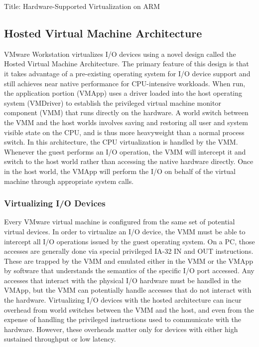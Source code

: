 \documentclass[runningheads]{llncs}
\begin{document}
Title: Hardware-Supported Virtualization on ARM


\subsection{Hosted Virtual Machine Architecture}
VMware Workstation virtualizes I/O devices using a novel design called the Hosted Virtual Machine Architecture. The primary feature of this design is that it takes advantage of a pre-existing operating system for I/O device support and still achieves near native performance for CPU-intensive workloads. When run, the application portion (VMApp) uses a driver loaded into the host operating system (VMDriver) to establish the privileged virtual machine monitor component (VMM) that runs directly on the hardware.  A world switch between the VMM and the host worlds involves saving and restoring all user and system visible state on the CPU, and is thus more heavyweight than a normal process switch. In this architecture, the CPU virtualization is handled by the VMM. Whenever the guest performs an I/O operation, the VMM will intercept it and switch to the host world rather than accessing the native hardware directly. Once in the host world, the VMApp will perform the I/O on behalf of the virtual machine through appropriate system calls.
 
\subsubsection{Virtualizing I/O Devices}
Every VMware virtual machine is configured from the same set of potential virtual devices. In order to virtualize an I/O device, the VMM must be able to intercept all I/O operations issued by the guest operating system. On a PC, those accesses are generally done via special privileged IA-32 IN and OUT instructions. These are trapped by the VMM and emulated either in the VMM or the VMApp by software that understands the semantics of the specific I/O port accessed. Any accesses that interact with the physical I/O hardware must be handled in the VMApp, but the VMM can potentially handle accesses that do not interact with the hardware. Virtualizing I/O devices with the hosted architecture can incur overhead from world switches between the VMM and the host, and even from the expense of handling the privileged instructions used to communicate with the hardware. However, these overheads matter only for devices with either high sustained throughput or low latency. 
 
\end{document}
